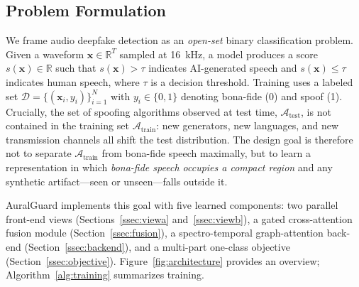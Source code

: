 
\newcommand{\R}{\mathbb{R}}
\newcommand{\bone}{\mathbf{1}}

\subsection{Problem Formulation}
\label{ssec:formulation}

We frame audio deepfake detection as an \emph{open-set} binary classification problem.
Given a waveform $\mathbf{x} \in \R^{T}$ sampled at 16~kHz, a model produces a score
$s(\mathbf{x}) \in \R$ such that $s(\mathbf{x}) > \tau$ indicates AI-generated speech and
$s(\mathbf{x}) \leq \tau$ indicates human speech, where $\tau$ is a decision threshold.
Training uses a labeled set $\mathcal{D} = \{(\mathbf{x}_i, y_i)\}_{i=1}^N$ with
$y_i \in \{0, 1\}$ denoting bona-fide (0) and spoof (1). Crucially, the set of spoofing
algorithms observed at test time, $\mathcal{A}_{\text{test}}$, is not contained in the
training set $\mathcal{A}_{\text{train}}$: new generators, new languages, and new
transmission channels all shift the test distribution. The design goal is therefore not
to separate $\mathcal{A}_{\text{train}}$ from bona-fide speech maximally, but to learn a
representation in which \emph{bona-fide speech occupies a compact region} and any
synthetic artifact---seen or unseen---falls outside it.

AuralGuard implements this goal with five learned components: two parallel front-end
views (Sections~\ref{ssec:viewa} and~\ref{ssec:viewb}), a gated cross-attention fusion
module (Section~\ref{ssec:fusion}), a spectro-temporal graph-attention back-end
(Section~\ref{ssec:backend}), and a multi-part one-class objective
(Section~\ref{ssec:objective}). Figure~\ref{fig:architecture} provides an overview;
Algorithm~\ref{alg:training} summarizes training.

